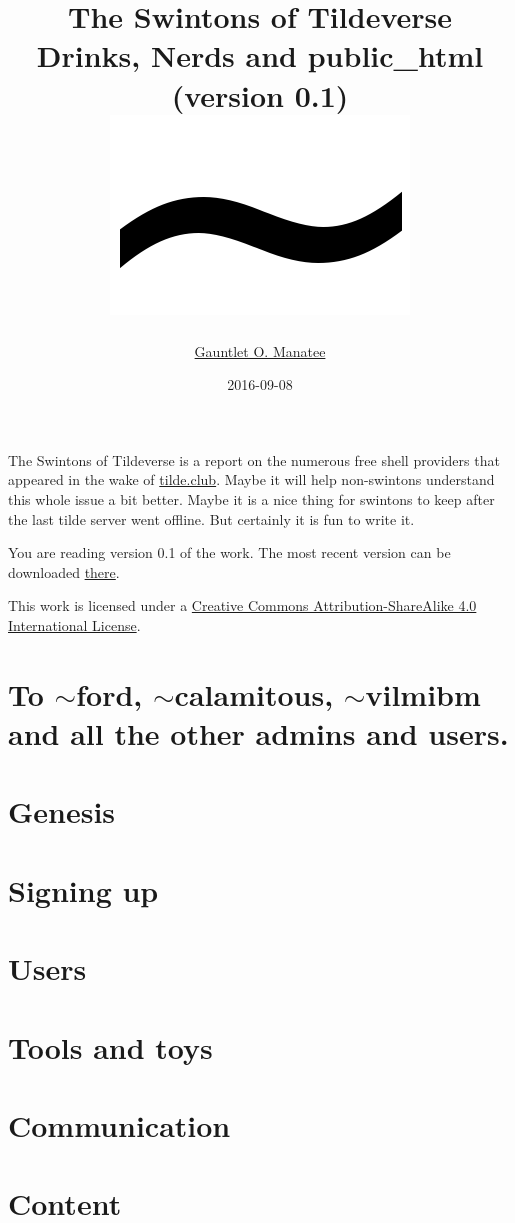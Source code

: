 \documentclass[12pt]{report}
\title{
	{The Swintons of Tildeverse}\\
	{\large Drinks, Nerds and public\_html\\(version 0.1)}\\
	{\includegraphics{tilde02.png}}
}
\author{\href{mailto:gauntlet@ctrl-c.club}{Gauntlet O. Manatee}}
\date{2016-09-08}
\begin{document}
\maketitle
\chapter*{}
The Swintons of Tildeverse is a report on the numerous free shell providers that appeared in the wake of \href{http://www.tilde.club/}{tilde.club}. Maybe it will help non-swintons understand this whole issue a bit better. Maybe it is a nice thing for swintons to keep after the last tilde server went offline. But certainly it is fun to write it.

You are reading version 0.1 of the work. The most recent version can be downloaded \href{http://www.ctrl-c.club/~gauntlet/tsot#download}{there}.

This work is licensed under a \href{http://creativecommons.org/licenses/by-sa/4.0/}{Creative Commons Attribution-ShareAlike 4.0 International License}.
\chapter*{To $\sim$ford, $\sim$calamitous, $\sim$vilmibm and all the other admins and users.}
\tableofcontents{}
\chapter{Genesis}

\chapter{Signing up}

\chapter{Users}

\chapter{Tools and toys}

\chapter{Communication}

%
\chapter{Content}

\end{document}
